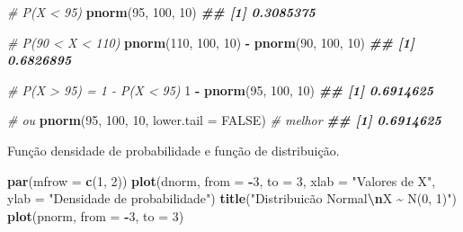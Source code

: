 \documentclass[
]{book}
\newenvironment{Shaded}{\begin{snugshade}}{\end{snugshade}}
\newcommand{\AttributeTok}[1]{\textcolor[rgb]{0.13,0.29,0.53}{#1}}
\newcommand{\CommentTok}[1]{\textcolor[rgb]{0.56,0.35,0.01}{\textit{#1}}}
\newcommand{\ConstantTok}[1]{\textcolor[rgb]{0.56,0.35,0.01}{#1}}
\newcommand{\DecValTok}[1]{\textcolor[rgb]{0.00,0.00,0.81}{#1}}
\newcommand{\DocumentationTok}[1]{\textcolor[rgb]{0.56,0.35,0.01}{\textbf{\textit{#1}}}}
\newcommand{\FunctionTok}[1]{\textcolor[rgb]{0.13,0.29,0.53}{\textbf{#1}}}
\newcommand{\NormalTok}[1]{#1}
\newcommand{\SpecialCharTok}[1]{\textcolor[rgb]{0.81,0.36,0.00}{\textbf{#1}}}
\newcommand{\StringTok}[1]{\textcolor[rgb]{0.31,0.60,0.02}{#1}}
\begin{document}
\begin{Shaded}
\begin{Highlighting}[]
\CommentTok{\# P(X \textless{} 95)}
\FunctionTok{pnorm}\NormalTok{(}\DecValTok{95}\NormalTok{, }\DecValTok{100}\NormalTok{, }\DecValTok{10}\NormalTok{)}
\DocumentationTok{\#\# [1] 0.3085375}

\CommentTok{\# P(90 \textless{} X \textless{} 110)}
\FunctionTok{pnorm}\NormalTok{(}\DecValTok{110}\NormalTok{, }\DecValTok{100}\NormalTok{, }\DecValTok{10}\NormalTok{) }\SpecialCharTok{{-}} \FunctionTok{pnorm}\NormalTok{(}\DecValTok{90}\NormalTok{, }\DecValTok{100}\NormalTok{, }\DecValTok{10}\NormalTok{)}
\DocumentationTok{\#\# [1] 0.6826895}

\CommentTok{\# P(X \textgreater{} 95) = 1 {-} P(X \textless{} 95)}
\DecValTok{1} \SpecialCharTok{{-}} \FunctionTok{pnorm}\NormalTok{(}\DecValTok{95}\NormalTok{, }\DecValTok{100}\NormalTok{, }\DecValTok{10}\NormalTok{)}
\DocumentationTok{\#\# [1] 0.6914625}

\CommentTok{\# ou}
\FunctionTok{pnorm}\NormalTok{(}\DecValTok{95}\NormalTok{, }\DecValTok{100}\NormalTok{, }\DecValTok{10}\NormalTok{, }\AttributeTok{lower.tail =} \ConstantTok{FALSE}\NormalTok{) }\CommentTok{\# melhor}
\DocumentationTok{\#\# [1] 0.6914625}
\end{Highlighting}
\end{Shaded}

Função densidade de probabilidade e função de distribuição.

\begin{Shaded}
\begin{Highlighting}[]
\FunctionTok{par}\NormalTok{(}\AttributeTok{mfrow =} \FunctionTok{c}\NormalTok{(}\DecValTok{1}\NormalTok{, }\DecValTok{2}\NormalTok{))}
\FunctionTok{plot}\NormalTok{(dnorm, }\AttributeTok{from =} \SpecialCharTok{{-}}\DecValTok{3}\NormalTok{, }\AttributeTok{to =} \DecValTok{3}\NormalTok{, }
     \AttributeTok{xlab =} \StringTok{"Valores de X"}\NormalTok{,}
     \AttributeTok{ylab =} \StringTok{"Densidade de probabilidade"}\NormalTok{)}
\FunctionTok{title}\NormalTok{(}\StringTok{"Distribuicão Normal}\SpecialCharTok{\textbackslash{}n}\StringTok{X \textasciitilde{} N(0, 1)"}\NormalTok{)}
\FunctionTok{plot}\NormalTok{(pnorm, }\AttributeTok{from =} \SpecialCharTok{{-}}\DecValTok{3}\NormalTok{, }\AttributeTok{to =} \DecValTok{3}\NormalTok{)}
\end{Highlighting}
\end{Shaded}
\end{document}
